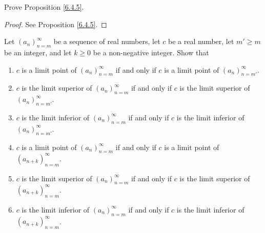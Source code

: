 \exercisesection

\begin{exercise}\label{ex 6.4.1}
Prove Proposition \ref{6.4.5}.
\end{exercise}

\begin{proof}
See Proposition \ref{6.4.5}.
\end{proof}

\begin{exercise}\label{ex 6.4.2}
Let \((a_n)_{n = m}^\infty\) be a sequence of real numbers, let \(c\) be a real number, let \(m' \geq m\) be an integer, and let \(k \geq 0\) be a non-negative integer.
Show that
\begin{enumerate}
    \item \(c\) is a limit point of \((a_n)_{n = m}^\infty\) if and only if \(c\) is a limit point of \((a_n)_{n = m'}^\infty\).
    \item \(c\) is the limit superior of \((a_n)_{n = m}^\infty\) if and only if \(c\) is the limit superior of \((a_n)_{n = m'}^\infty\).
    \item \(c\) is the limit inferior of \((a_n)_{n = m}^\infty\) if and only if \(c\) is the limit inferior of \((a_n)_{n = m'}^\infty\).
    \item \(c\) is a limit point of \((a_n)_{n = m}^\infty\) if and only if \(c\) is a limit point of \((a_{n + k})_{n = m}^\infty\).
    \item \(c\) is the limit superior of \((a_n)_{n = m}^\infty\) if and only if \(c\) is the limit superior of \((a_{n + k})_{n = m}^\infty\).
    \item \(c\) is the limit inferior of \((a_n)_{n = m}^\infty\) if and only if \(c\) is the limit inferior of \((a_{n + k})_{n = m}^\infty\).
\end{enumerate}
\end{exercise}

